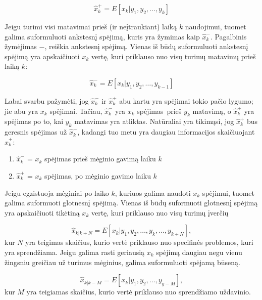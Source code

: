     \begin{equation}
        \hat{x}_k^{+} = E[x_k|y_1,y_2, \dots , y_k]
    \end{equation}

    Jeigu turimi visi matavimai prieš (ir neįtraukiant) laiką $k$ naudojimui, tuomet galima suformuluoti ankstesnį spėjimą, kuris yra žymimas kaip $\hat{x}_k^{-}$.
    Pagalbinis žymėjimas $-$, reiškia ankstesnį spėjimą.
    Vienas iš būdų suformuluoti ankstesnį spėjimą yra apskaičiuoti $x_k$ vertę, kuri priklauso nuo visų turimų matavimų prieš laiką $k$:

    \begin{equation}
        \hat{x}_k^{-} = E[x_k|y_1,y_2,\dots, y_{k-1}]
    \end{equation}

    Labai svarbu pažymėti, jog $\hat{x}^-_k$ ir $\hat{x}_k^{+}$ abu kartu yra spėjimai tokio pačio lygumo; jie abu yra $x_k$ spėjimai.
    Tačiau, $\hat{x}_k^-$ yra $x_k$ spėjimas prieš $y_k$ matavimą, o $\hat{x}_k^+$ yra spėjimas po to, kai $y_k$ matavimas yra atliktas.
    Natūraliai yra tikimąsi, jog $\hat{x}_k^+$ bus geresnis spėjimas už $\hat{x}_k^-$, kadangi tuo metu yra daugiau informacijos skaičiuojant $\hat{x}_k^+$:

    \begin{enumerate}
        \item $\hat{x}_k^-$ = $x_k$ spėjimas prieš mėginio gavimą laiku $k$
        \item $\hat{x}_k^+$ = $x_k$ spėjimas, po mėginio gavimo laiku $k$
    \end{enumerate}

    Jeigu egzistuoja mėginiai po laiko $k$, kuriuos galima naudoti $x_k$ spėjimui, tuomet galima suformuoti glotnesnį spėjimą.
    Vienas iš būdų suformuoti glotnesnį spėjimą yra apskaičiuoti tikėtiną $x_k$ vertę, kuri priklauso nuo visų turimų įverčių

    \begin{equation}
        \hat{x}_{k|k+N} = E[x_k|y_1,y_2,\dots,y_k,\dots, y_{k+N}],
    \end{equation}
    kur $N$ yra teigimas skaičius, kurio vertė priklauso nuo specifinės problemos, kuri yra sprendžiama.
    Jeigu galima rasti geriausią $x_k$ spėjimą daugiau negu vienu žingsniu greičiau už turimus mėginius, galima suformuluoti spėjamą būseną.

    \begin{equation}
        \hat{x}_{k|k-M} = E[x_k|y_1,y_2, \dots, y_{y-M}],
    \end{equation}
    kur $M$ yra teigiamas skaičius, kurio vertė priklauso nuo sprendžiamo uždavinio.

